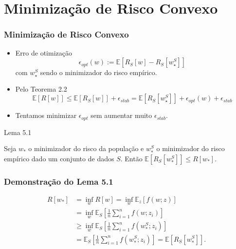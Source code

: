\documentclass{beamer}
\newcommand{\EE}{\mathbb{E}}
\begin{document}

\section{Minimização de Risco Convexo}
\begin{frame}
\tableofcontents[currentsection]
\end{frame}


\begin{frame}
\frametitle{Minimização de Risco Convexo}
\begin{itemize}
    \item Erro de otimização
    $$\epsilon_{opt}(w) :=\EE[R_S[w] - R_S[w_\star^S]]$$
    com $w_\star^S$ sendo o minimizador do risco empírico.
    \item Pelo Teorema 2.2
    $$\EE[R[w]] \le \EE[R_S[w]] + \epsilon_{stab} = \EE[ R_S[w_\star^S]] + \epsilon_{opt}(w) + \epsilon_{stab}$$
    \item Tentamos minimizar $\epsilon_{opt}$ sem aumentar muito $\epsilon_{stab}$.
\end{itemize}
\end{frame}


\begin{frame}{Lema 5.1}
\begin{lemma}
Seja \(w_*\) o minimizador do risco da população e \(w_*^S\) o minimizador do risco empírico dado um conjunto de dados $S$. Então \(\EE[R_S[w_*^S]] \le R[w_*]\). 
\end{lemma}
\end{frame}

\begin{frame}
\frametitle{Demonstração do Lema 5.1}  
\begin{align*}
R[w_*] &= \inf_w R[w] = \inf_w \EE_z[f(w;z)] \\
&= \inf_w \EE_S\left[\frac{1}{n}\sum_{i=1}^n f(w;z_i)\right] \\
&\ge\inf_w \EE_S\left[ \frac{1}{n}\sum_{i=1}^n f(w_*^S;z_i)\right]  \\
&= \EE_S\left[\frac{1}{n}\sum_{i=1}^n f(w_*^S;z_i)\right] = \EE[R_S[w_*^S]].
\end{align*}  
\end{frame}
\end{document}
